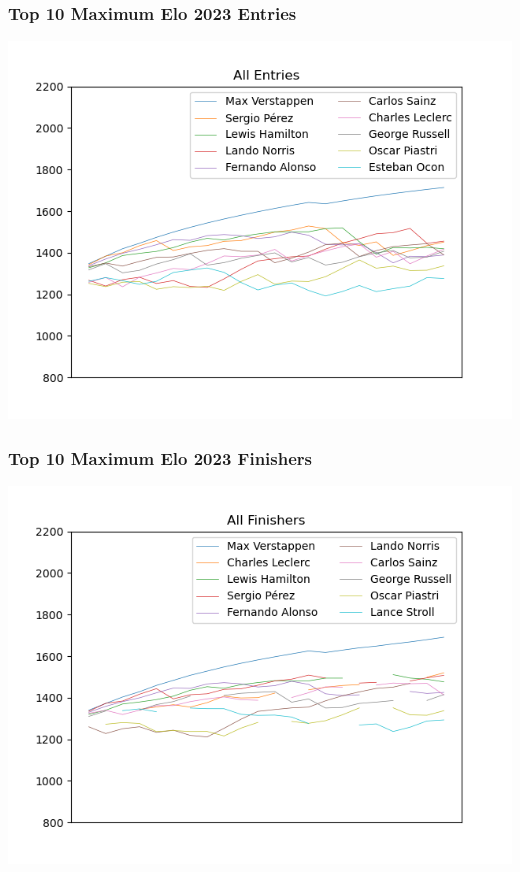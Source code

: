 \documentclass{beamer}
\begin{document}
\begin{frame}
    \frametitle{Top 10 Maximum Elo 2023 Entries}
    \includegraphics[width=\textwidth]{2023Top10EloAll.png}
\end{frame}

\begin{frame}
    \frametitle{Top 10 Maximum Elo 2023 Finishers}
    \includegraphics[width=\textwidth]{2023Top10EloFinished.png}
\end{frame}
\end{document}
